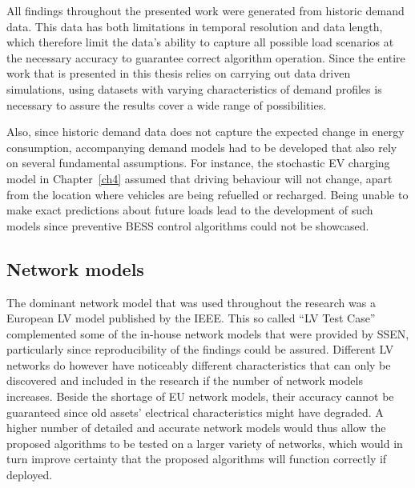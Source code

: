 All findings throughout the presented work were generated from historic demand data.
This data has both limitations in temporal resolution and data length, which therefore limit the data's ability to capture all possible load scenarios at the necessary accuracy to guarantee correct algorithm operation.
Since the entire work that is presented in this thesis relies on carrying out data driven simulations, using datasets with varying characteristics of demand profiles is necessary to assure the results cover a wide range of possibilities.

Also, since historic demand data does not capture the expected change in energy consumption, accompanying demand models had to be developed that also rely on several fundamental assumptions.
For instance, the stochastic EV charging model in Chapter~\ref{ch4} assumed that driving behaviour will not change, apart from the location where vehicles are being refuelled or recharged.
Being unable to make exact predictions about future loads lead to the development of such models since preventive BESS control algorithms could not be showcased.

\subsection{Network models}

The dominant network model that was used throughout the research was a European LV model published by the IEEE.
This so called ``LV Test Case'' complemented some of the in-house network models that were provided by SSEN, particularly since reproducibility of the findings could be assured.
Different LV networks do however have noticeably different characteristics that can only be discovered and included in the research if the number of network models increases.
Beside the shortage of EU network models, their accuracy cannot be guaranteed since old assets' electrical characteristics might have degraded.
A higher number of detailed and accurate network models would thus allow the proposed algorithms to be tested on a larger variety of networks, which would in turn improve certainty that the proposed algorithms will function correctly if deployed.


